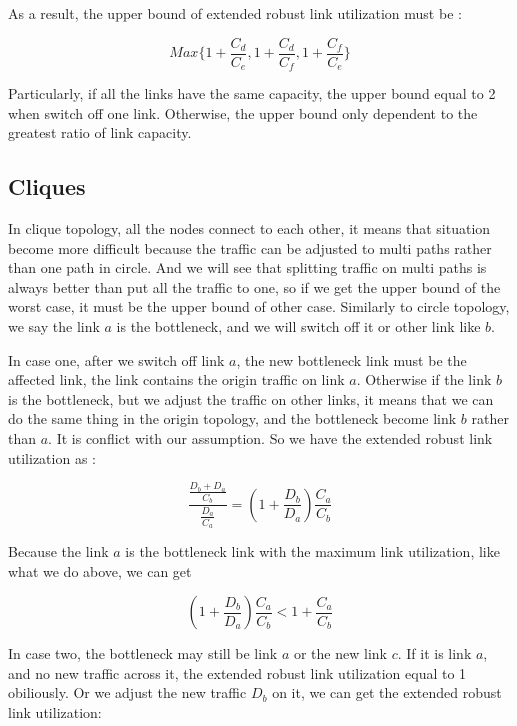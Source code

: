 \documentclass[conference]{IEEEtran}
\begin{document}
As a result, the upper bound of extended robust link utilization must be :

\begin{equation}
    Max\{1 + \frac{C_d}{C_e}, 1 + \frac{C_d}{C_f}, 1 + \frac{C_f}{C_e}\}
\end{equation}

Particularly, if all the links have the same capacity, the upper bound equal to 2 when switch off one link. Otherwise, the 
upper bound only dependent to the greatest ratio of link capacity.
 
\subsection{Cliques}
In clique topology, all the nodes connect to each other, it means that situation become more difficult because the traffic
can be adjusted to multi paths rather than one path in circle. And we will see that splitting traffic on multi paths is 
always better than put all the traffic to one, so if we get the upper bound of the worst case, it must be the upper bound
of other case. Similarly to circle topology, we say the link $a$ is the bottleneck, and we will switch off it or other link
like $b$.

In case one, after we switch off link $a$, the new bottleneck link must be the affected link, the link contains the origin 
traffic on link $a$. Otherwise if the link $b$ is the bottleneck, but we adjust the traffic on other links, it means that
we can do the same thing in the origin topology, and the bottleneck become link $b$ rather than $a$. It is conflict with our
assumption. So we have the extended robust link utilization as :

\begin{equation}
    \frac {\frac{D_b + D_a}{C_b}}{\frac{D_a}{C_a}} = (1+\frac{D_b}{D_a}) \frac{C_a}{C_b}
\end{equation}

Because the link $a$ is the bottleneck link with the maximum link utilization, like what we do above, we can get 

\begin{equation}
    (1+\frac{D_b}{D_a}) \frac{C_a}{C_b} < 1 + \frac{C_a}{C_b}
\end{equation}

In case two, the bottleneck may still be link $a$ or the new link $c$. If it is link $a$, and no new traffic across it,
the extended robust link utilization equal to 1 obiliously. Or we adjust the new traffic $D_b$ on it, we can get the
extended robust link utilization:
\end{document}
